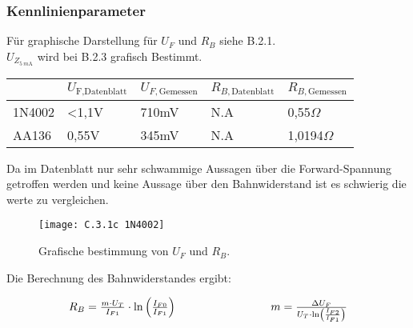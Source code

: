 \documentclass[
	a4paper, %
	12pt, %
]{CSUniSchoolLabReport}
\newcommand{\milli}{m}
\begin{document}
\subsubsection{Kennlinienparameter}
Für graphische Darstellung für $U_F$ und $R_B$ siehe B.2.1. \\
$U_{Z_{\SI{5}{\milli\ampere}}}$ wird bei B.2.3 grafisch Bestimmt. \\

\begin{table}[H]
\centering
\begin{tabular}{l|llll}
							& $U_{\text{F,Datenblatt}}$ & $U_{F,\text{Gemessen}}$ & $R_{B,\text{Datenblatt}}$ & $R_{B,\text{Gemessen}}$ \\
\hline
1N4002                     & <1,1V                        & 710mV                      & N.A                          & 0,55$\Omega$                       \\
\hline
AA136                      & 0,55V                        & 345mV                      & N.A                          & 1,0194$\Omega$                       \\                       
\end{tabular}
\end{table}

Da im Datenblatt nur sehr schwammige Aussagen über die Forward-Spannung getroffen werden und keine Aussage über den Bahnwiderstand ist es schwierig die werte zu vergleichen.



\begin{figure}[H] %
	\centering %
	\texttt{[image: C.3.1c 1N4002]} %
	\caption{Grafische bestimmung von $U_F$ und $R_B$.}
\end{figure}

\vspace{1em}

Die Berechnung des Bahnwiderstandes ergibt:

\begin{equation}
\begin{array}{c@{\hspace{3cm}}c}
R_B = \frac{m \cdot U_T}{I_{F1}} \cdot \ln\left(\frac{I_{F0}}{I_{F1}}\right)
&
m = \frac{\Delta U_F}{U_T \cdot \ln\left( \frac{I_{F2}}{I_{F1}} \right)}
\end{array}
\end{equation}
\end{document}
